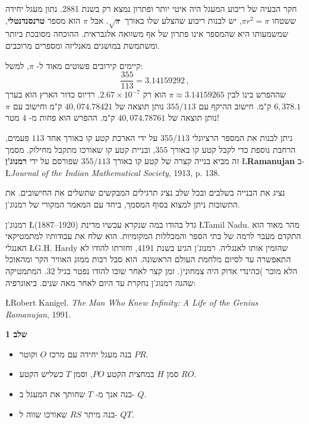 \documentclass[12pt,a4paper]{article}
\begin{document}
חקר הבעיה של ריבוע המעגל היה איטי יותר ופתרון נמצא רק בשנת 2881. נתון מעגל יחידה ששטחו
$\pi r^2=\pi$,
יש לבנות ריבוע שהצלע שלו באורך
$\sqrt{\pi}$.
אבל
$\pi$
הוא מספר
\textbf{טרנסנדנטלי},
שמשמעותו היא שהמספר אינו פתרון של אף משוואה אלגבראית. ההוכחה מסובכת ביותר ומשתמשת במושגים מאנליזה ומספרים מרוכבים.

קיימים קירובים פשוטים מאוד ל-%
$\pi$,
למשל:
\[
\frac{355}{113}=3.14159292\,,
\]
שההפרש בינו לבין
$\pi\approx 3.14159265$
הוא רק 
$2.67\times 10^{-7}$.
רדיוס כדור הארץ הוא בערך
$6,378.1$
ק"מ. חישוב ההיקף עם
$355/113$
נותן תוצאה של
$40,074.78421$
ק"מ וחישוב עם
$\pi$
נותן תוצאה של
$40,074.78761$
ק"מ. ההפרש הוא פחות מ-%
$4$
מטר!

ניתן לבנות את המספר הרציונלי
$355/113$
על ידי הארכת קטע קו באורך אחד
$113$
פעמים,
הרחבת נוספת כדי לקבל קטע קו באורך 
$355$,
ובניית קטע קו שאורכו מתקבל מחילוק. מסמך זה מביא בנייה קצרה של קטע קו באורך
$355/113$
שפורסם על ידי
\textbf{רמנוג'ן}
\L{\textbf{Ramanujan}}
ב-\\
\L{\emph{Journal of the Indian Mathematical Society}, 1913, p. 138}.

נציג את הבנייה בשלבים ובכל שלב נציג תרגילים המבקשים שתשלים את החישובים. את התשובות ניתן למצוא בסוף המסמך, ביחד עם המאמר המקורי של רמנוג'ן.

רמנוג'ן
\L{(1887--1920)}
גדל בהודו במה שנקרא עכשיו מדינת
\L{Tamil Nadu}.
מהר מאוד הוא התקדם מעבר לרמה של בתי הספר והמכללות המקומיות. הוא שלח את עבודותיו למתמטיקאי האנגלי
\L{G.H. Hardy}
שהזמין אותו לאנגליה. רמנוג'ן הגיע בשנת 4191, וחזרתו להודו לא התאפשרה עד לסיום מלחמת העולם הראשונה. הוא סבל רבות ממזג האוויר הקר ומהאוכל הלא מוכר )כהינדי אדוק היה צמחוני(. זמן קצר לאחר שובו להודו נפטר בגיל 
$32$.
המתמטיקה שהגה רמנוג'ן נחקרת עד היום לאחר מאה שנים. ביאוגרפיה:

\L{Robert Kanigel. \emph{The Man Who Knew Infinity: A Life of the Genius Ramanujan}, 1991.}


\newpage


\begin{center}
\textbf{\Large שלב 1}
\end{center}

\begin{itemize}
\item
בנה מעגל יחידה עם מרכז
$O$
וקוטר
$PR$.
\item 
סמן
$H$
במחצית הקטע
$PO$,
וסמן
$T$
כשליש הקטע
$RO$.
\item
בנה אנך מ-%
$T$
שחותך את המעגל ב-%
$Q$.
\item 
בנה מיתר
$RS$
שאורכו שווה ל-%
$QT$.
\end{itemize}
\end{document}
